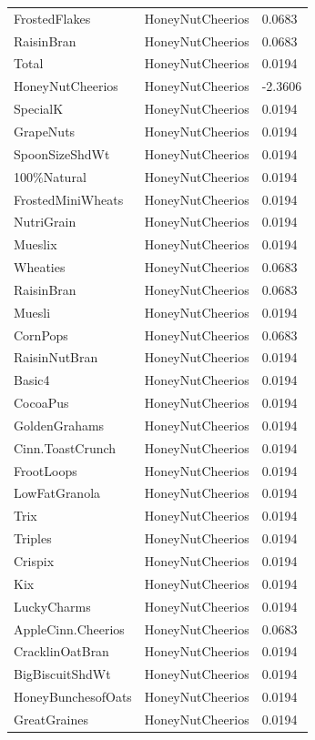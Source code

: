 \begin{table}[!htbp]
\begin{tabular}{lll}
FrostedFlakes & HoneyNutCheerios & 0.0683
\\
RaisinBran & HoneyNutCheerios & 0.0683
\\
Total & HoneyNutCheerios & 0.0194
\\
HoneyNutCheerios & HoneyNutCheerios & -2.3606
\\
SpecialK & HoneyNutCheerios & 0.0194
\\
GrapeNuts & HoneyNutCheerios & 0.0194
\\
SpoonSizeShdWt & HoneyNutCheerios & 0.0194
\\
100\%Natural & HoneyNutCheerios & 0.0194
\\
FrostedMiniWheats & HoneyNutCheerios & 0.0194
\\
NutriGrain & HoneyNutCheerios & 0.0194
\\
Mueslix & HoneyNutCheerios & 0.0194
\\
Wheaties & HoneyNutCheerios & 0.0683
\\
RaisinBran & HoneyNutCheerios & 0.0683
\\
Muesli & HoneyNutCheerios & 0.0194
\\
CornPops & HoneyNutCheerios & 0.0683
\\
RaisinNutBran & HoneyNutCheerios & 0.0194
\\
Basic4 & HoneyNutCheerios & 0.0194
\\
CocoaPus & HoneyNutCheerios & 0.0194
\\
GoldenGrahams & HoneyNutCheerios & 0.0194
\\
Cinn.ToastCrunch & HoneyNutCheerios & 0.0194
\\
FrootLoops & HoneyNutCheerios & 0.0194
\\
LowFatGranola & HoneyNutCheerios & 0.0194
\\
Trix & HoneyNutCheerios & 0.0194
\\
Triples & HoneyNutCheerios & 0.0194
\\
Crispix & HoneyNutCheerios & 0.0194
\\
Kix & HoneyNutCheerios & 0.0194
\\
LuckyCharms & HoneyNutCheerios & 0.0194
\\
AppleCinn.Cheerios & HoneyNutCheerios & 0.0683
\\
CracklinOatBran & HoneyNutCheerios & 0.0194
\\
BigBiscuitShdWt & HoneyNutCheerios & 0.0194
\\
HoneyBunchesofOats & HoneyNutCheerios & 0.0194
\\
GreatGraines & HoneyNutCheerios & 0.0194

\end{tabular}
\end{table}

